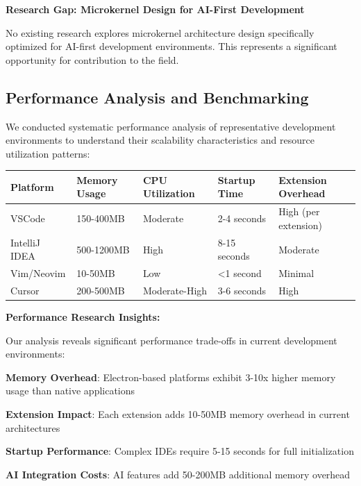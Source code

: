 \textbf{Research Gap: Microkernel Design for AI-First Development}

No existing research explores microkernel architecture design specifically optimized for AI-first development environments. This represents a significant opportunity for contribution to the field.

\subsection{Performance Analysis and Benchmarking}
\label{subsec:performance-analysis}

We conducted systematic performance analysis of representative development environments to understand their scalability characteristics and resource utilization patterns:

\begin{center}
\begin{tabular}{@{}lllll@{}}
\toprule
\textbf{Platform} & \textbf{Memory Usage} & \textbf{CPU Utilization} & \textbf{Startup Time} & \textbf{Extension Overhead} \\
\midrule
VSCode & 150-400MB & Moderate & 2-4 seconds & High (per extension) \\
IntelliJ IDEA & 500-1200MB & High & 8-15 seconds & Moderate \\
Vim/Neovim & 10-50MB & Low & <1 second & Minimal \\
Cursor & 200-500MB & Moderate-High & 3-6 seconds & High \\
\bottomrule
\end{tabular}
\label{tab:performance-analysis}
\end{center}

\textbf{Performance Research Insights:}

Our analysis reveals significant performance trade-offs in current development environments:

\begin{compactlist}
    \item \textbf{Memory Overhead}: Electron-based platforms exhibit 3-10x higher memory usage than native applications
    \item \textbf{Extension Impact}: Each extension adds 10-50MB memory overhead in current architectures
    \item \textbf{Startup Performance}: Complex IDEs require 5-15 seconds for full initialization
    \item \textbf{AI Integration Costs}: AI features add 50-200MB additional memory overhead
\end{compactlist}

